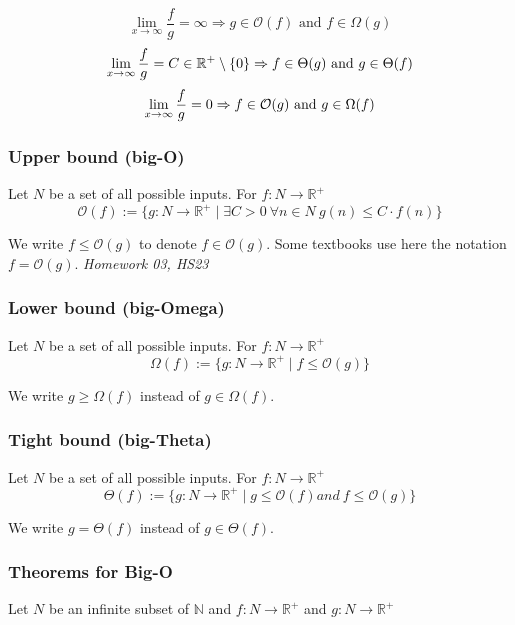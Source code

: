 \documentclass[a4paper]{article}
\begin{document}
    \begin{equation*}
    \lim_{x\to\infty}\frac fg = \infty \Rightarrow g \in \mathcal{O}(f) \text{ and } f \in \Omega(g)
    \end{equation*}
    \begin{equation*}
    \lim_{x \rightarrow \infty} \frac fg = C \in \mathbb{R}^+ \setminus \left\lbrace 0 \right\rbrace \Rightarrow f \in\Theta(g)  \text{ and } g \in\Theta(f) \\
    \end{equation*}
    \begin{equation*}
    \lim_{x \rightarrow \infty} \frac fg = 0 \Rightarrow f \in\mathcal{O}(g) \text{ and } g \in\Omega(f) \\
    \end{equation*}
    
    \subsubsection*{Upper bound (big-O)}
    Let ${N}$ be a set of all possible inputs. For $f: N \to \mathbb{R}^+$
    $$\mathcal{O}(f) :=\lbrace g: {N}\to\mathbb{R}^+\mid\exists C > 0 \ \forall n \in {N} \ g(n) \leq C \cdot f(n)\rbrace$$
    
    We write $f \leq \mathcal{O}(g)$ to denote $f \in \mathcal{O}(g)$. Some textbooks use here the notation $f = \mathcal{O}(g)$. \textit{Homework 03, HS23}
    
    \subsubsection*{Lower bound (big-Omega)}
    Let ${N}$ be a set of all possible inputs. For $f: N \to \mathbb{R}^+$
    $$\Omega(f) :=\lbrace g: {N} \to \mathbb{R}^+ \mid f \leq \mathcal{O}(g)\rbrace$$
    
    We write $g \geq \Omega(f)$ instead of $g \in \Omega(f)$.
    
    \subsubsection*{Tight bound (big-Theta)}
    Let ${N}$ be a set of all possible inputs. For $f: N \to \mathbb{R}^+$
    $$\Theta(f) :=\lbrace g: {N}\to\mathbb{R}^+\mid g \leq \mathcal{O}(f) and \ f \leq \mathcal{O}(g)\rbrace$$
    
    We write $g = \Theta(f)$ instead of $g \in \Theta(f)$.
    

    \subsubsection*{Theorems for Big-O}
    Let ${N}$ be an infinite subset of $\mathbb{N}$ and $f: N \to \mathbb{R}^+$ and $g: N \to \mathbb{R}^+$
\end{document}
